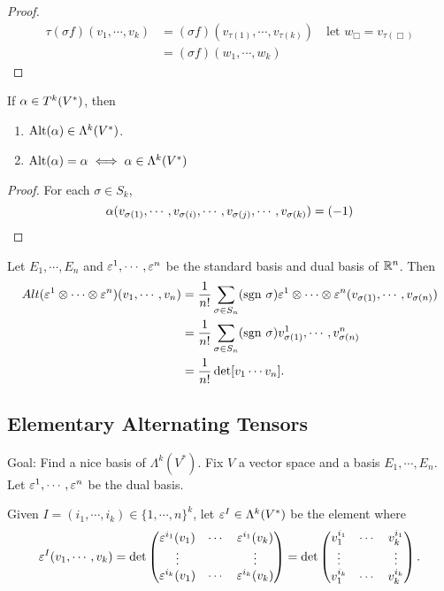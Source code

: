 \begin{proof}
    \begin{align*}
    \tau(\sigma f)(v_1,\cdots,v_k)
    &= (\sigma f)(v_{\tau(1)},\cdots,v_{\tau(k)}) \quad \text{let }w_\Box=v_{\tau(\Box)}\\
    &= (\sigma f)(w_1,\cdots,w_k) 
    \end{align*}
\end{proof}
\begin{proposition}
    If $\alpha \in T^k(V^*)$, then 
    \begin{enumerate}
    \item $\mathrm{Alt}(\alpha) \in \Lambda^k(V^*)$.
    \item $\mathrm{Alt}(\alpha) = \alpha \iff \alpha \in \Lambda^k(V^*)$
    \end{enumerate}
\end{proposition}
\begin{proof}
    For each $\sigma \in S_k$, 
    $$\alpha(v_{\sigma(1)},\cdots,v_{\sigma(i)},\cdots,v_{\sigma(j)},\cdots,v_{\sigma(k)}) = (-1) $$
\end{proof}
\begin{example}
    Let $E_1, \cdots, E_n$ and $\varepsilon^1,\cdots, \varepsilon^n$ be the standard basis and dual basis of $\mathbb{R}^n$. Then 
    \begin{align*}
    Alt(\varepsilon^1 \otimes \cdots \otimes \varepsilon^n)(v_1,\cdots,v_n) 
    &= \frac{1}{n!}\sum_{\sigma \in S_n}(\mathrm{sgn~} \sigma) \varepsilon^1 \otimes \cdots \otimes \varepsilon^n (v_{\sigma(1)}, \cdots, v_{\sigma(n) }) \\
    &=  \frac{1}{n!}\sum_{\sigma \in S_n}(\mathrm{sgn~} \sigma)
    v_{\sigma(1)}^1, \cdots, v_{\sigma(n)}^n \\
    &= \frac{1}{n!}\det [v_1 \cdots v_n].
    \end{align*}
\end{example}
\subsection{Elementary Alternating Tensors}
Goal: Find a nice basis of $\Lambda^k(V^*)$. 
Fix $V$ a vector space and a basis $E_1, \cdots, E_n$. Let $\varepsilon^1, \cdots, \varepsilon^n$ be the dual basis. 

Given $I = (i_1,\cdots,i_k) \in \{1,\cdots,n\}^k$, let $\varepsilon^I \in \Lambda^k(V^*)$ be the element where 
$$\varepsilon^I(v_1,\cdots,v_k) = \det \begin{pmatrix}
\varepsilon^{i_1}(v_1) & \cdots & \varepsilon^{i_1}(v_k) \\
\vdots & & \vdots \\
\varepsilon^{i_k}(v_1) & \cdots & \varepsilon^{i_k}(v_k) \end{pmatrix}
= \det \begin{pmatrix}
v_1^{i_1} & \cdots & v_k^{i_1} \\
\vdots & & \vdots \\
v_1^{i_k} & \cdots & v_k^{i_k} \end{pmatrix}.$$

